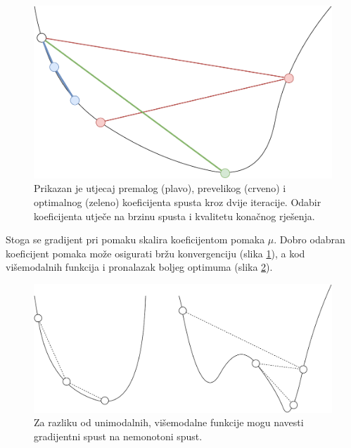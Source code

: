 \documentclass[times, utf8, numeric, diplomski]{fer}
\def\figref#1{(slika \ref{#1})}
\begin{document}
\begin{figure}[H]
\centering
\includegraphics[scale=0.4]{grad_descent_rate.pdf}
\caption{Prikazan je utjecaj premalog (plavo), prevelikog (crveno) i optimalnog (zeleno) koeficijenta spusta kroz dvije iteracije. Odabir koeficijenta utječe na brzinu spusta i kvalitetu konačnog rješenja.}
\label{fig:oscilira_divergira}
\end{figure}

Stoga se gradijent pri pomaku skalira koeficijentom pomaka $\mu$. Dobro odabran koeficijent pomaka može osigurati bržu konvergenciju \figref{fig:oscilira_divergira}, a kod višemodalnih funkcija i pronalazak boljeg optimuma \figref{fig:gradientni_spust}.

\begin{figure}[H]
\centering
\includegraphics[scale=0.45]{grad_descent_modality.pdf}
\caption{Za razliku od unimodalnih, višemodalne funkcije mogu navesti gradijentni spust na nemonotoni spust.}
\label{fig:gradientni_spust}
\end{figure}
\end{document}
